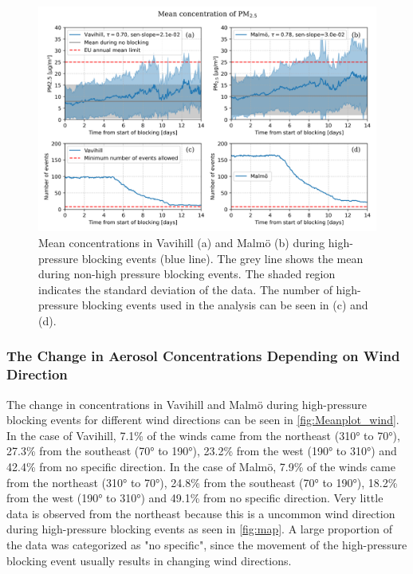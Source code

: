 \begin{figure}[H]
    \centering
    \includegraphics[width=\textwidth]{Figures/Meanplot.png}
    \caption{Mean \PM concentrations in Vavihill (a) and Malmö (b) during high-pressure blocking events (blue line). The grey line shows the mean \PM during non-high pressure blocking events. The shaded region indicates the standard deviation of the data. The number of high-pressure blocking events used in the analysis can be seen in (c) and (d).}
    \label{fig:Meanplot_Comparison}
\end{figure}

\subsubsection{The Change in Aerosol Concentrations Depending on Wind Direction}

The change in \PM concentrations in Vavihill and Malmö during high-pressure blocking events for different wind directions can be seen in \autoref{fig:Meanplot_wind}. In the case of Vavihill, 7.1\% of the winds came from the northeast (310° to 70°), 27.3\% from the southeast (70° to 190°), 23.2\% from the west (190° to 310°) and 42.4\% from no specific direction. In the case of Malmö, 7.9\% of the winds came from the northeast (310° to 70°), 24.8\% from the southeast (70° to 190°), 18.2\% from the west (190° to 310°) and 49.1\% from no specific direction. Very little data is observed from the northeast because this is a uncommon wind direction during high-pressure blocking events as seen in \autoref{fig:map}. A large proportion of the data was categorized as "no specific", since the movement of the high-pressure blocking event usually results in changing wind directions. 


